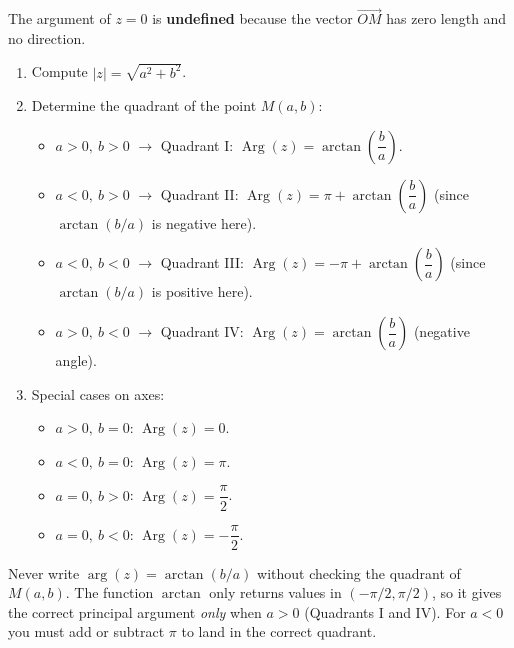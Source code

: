 \documentclass[11pt]{article}
\begin{document}
\begin{attention}
The argument of $z = 0$ is \textbf{undefined} because the vector $\overrightarrow{OM}$ has zero length and no direction.
\end{attention}

\begin{methode}
\begin{enumerate}
    \item Compute $|z| = \sqrt{a^2+b^2}$.
    \item Determine the quadrant of the point $M(a,b)$:
          \begin{itemize}
              \item $a>0,\ b>0$  $\rightarrow$ Quadrant I: $\operatorname{Arg}(z) = \arctan\left(\dfrac{b}{a}\right)$.
              \item $a<0,\ b>0$  $\rightarrow$ Quadrant II: $\operatorname{Arg}(z) = \pi + \arctan\left(\dfrac{b}{a}\right)$ (since $\arctan(b/a)$ is negative here).
              \item $a<0,\ b<0$  $\rightarrow$ Quadrant III: $\operatorname{Arg}(z) = -\pi + \arctan\left(\dfrac{b}{a}\right)$ (since $\arctan(b/a)$ is positive here).
              \item $a>0,\ b<0$  $\rightarrow$ Quadrant IV: $\operatorname{Arg}(z) = \arctan\left(\dfrac{b}{a}\right)$ (negative angle).
          \end{itemize}
    \item Special cases on axes:
          \begin{itemize}
              \item $a>0,\ b=0$: $\operatorname{Arg}(z) = 0$.
              \item $a<0,\ b=0$: $\operatorname{Arg}(z) = \pi$.
              \item $a=0,\ b>0$: $\operatorname{Arg}(z) = \dfrac{\pi}{2}$.
              \item $a=0,\ b<0$: $\operatorname{Arg}(z) = -\dfrac{\pi}{2}$.
          \end{itemize}
\end{enumerate}
\end{methode}

\begin{attention}
Never write $\arg(z) = \arctan(b/a)$ without checking the quadrant of $M(a,b)$.  The function $\arctan$ only returns values in $(-\pi/2, \pi/2)$, so it gives the correct principal argument \emph{only} when $a > 0$ (Quadrants I and IV).  For $a < 0$ you must add or subtract $\pi$ to land in the correct quadrant.
\end{attention}
\end{document}
